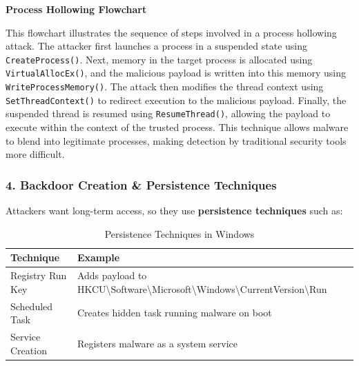 \begin{center}
    \textbf{Process Hollowing Flowchart} \\
\end{center}  

This flowchart illustrates the sequence of steps involved in a process hollowing attack. 
The attacker first launches a process in a suspended state using \texttt{CreateProcess()}. 
Next, memory in the target process is allocated using \texttt{VirtualAllocEx()}, and the malicious payload is written into this memory using \texttt{WriteProcessMemory()}. 
The attack then modifies the thread context using \texttt{SetThreadContext()} to redirect execution to the malicious payload. 
Finally, the suspended thread is resumed using \texttt{ResumeThread()}, allowing the payload to execute within the context of the trusted process.
This technique allows malware to blend into legitimate processes, making detection by traditional security tools more difficult.


\subsubsection{4. Backdoor Creation \& Persistence Techniques}

Attackers want long-term access, so they use \textbf{persistence techniques} such as:

\begin{table}[H]
    \centering
    \begin{tabular}{|l|l|}
        \hline
        \textbf{Technique} & \textbf{Example} \\
        \hline
        Registry Run Key & Adds payload to HKCU\textbackslash Software\textbackslash Microsoft\textbackslash Windows\textbackslash CurrentVersion\textbackslash Run \\
        Scheduled Task & Creates hidden task running malware on boot \\
        Service Creation & Registers malware as a system service \\
        \hline
    \end{tabular}
    \caption{Persistence Techniques in Windows}
\end{table}



